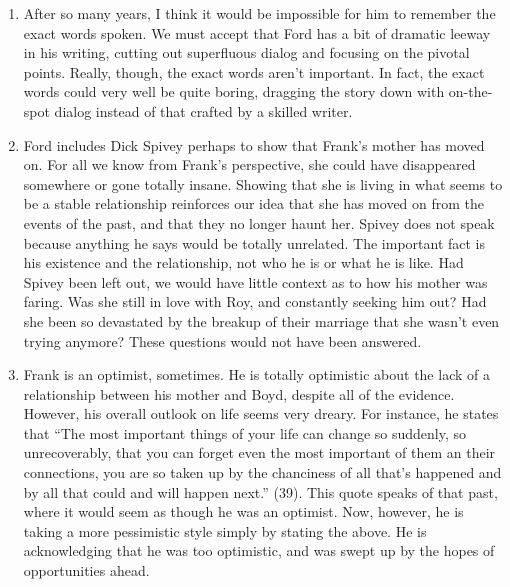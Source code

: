 \documentclass[12pt,letterpaper]{article}
\begin{document}
\begin{enumerate}
\item After so many years, I think it would be impossible for him to remember
the exact words spoken.  We must accept that Ford has a bit of dramatic leeway
in his writing, cutting out superfluous dialog and focusing on the pivotal
points.  Really, though, the exact words aren't important.  In fact, the exact
words could very well be quite boring, dragging the story down with on-the-spot
dialog instead of that crafted by a skilled writer.

\item Ford includes Dick Spivey perhaps to show that Frank's mother has moved
on.  For all we know from Frank's perspective, she could have disappeared
somewhere or gone totally insane.  Showing that she is living in what seems to
be a stable relationship reinforces our idea that she has moved on from the
events of the past, and that they no longer haunt her.  Spivey does not speak
because anything he says would be totally unrelated.  The important fact is his
existence and the relationship, not who he is or what he is like.  Had Spivey
been left out, we would have little context as to how his mother was faring.
Was she still in love with Roy, and constantly seeking him out?  Had she been so
devastated by the breakup of their marriage that she wasn't even trying anymore?
These questions would not have been answered.

\item Frank is an optimist, sometimes.  He is totally optimistic about the lack
of a relationship between his mother and Boyd, despite all of the evidence.
However, his overall outlook on life seems very dreary.  For instance, he states
that ``The most important things of your life can change so suddenly, so
unrecoverably, that you can forget even the most important of them an their
connections, you are so taken up by the chanciness of all that's happened and by
all that could and will happen next.'' (39).  This quote speaks of that past,
where it would seem as though he was an optimist.  Now, however, he is taking a
more pessimistic style simply by stating the above.  He is acknowledging that he
was too optimistic, and was swept up by the hopes of opportunities ahead.

\end{enumerate}
\end{document}
